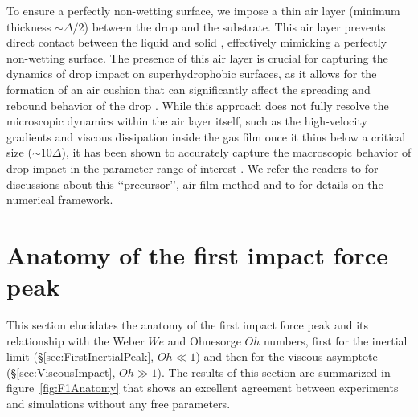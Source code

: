 \documentclass{jfm}
\begin{document}
To ensure a perfectly non-wetting surface, we impose a thin air layer (minimum thickness $\sim \Delta/2$) between the drop and the substrate. This air layer prevents direct contact between the liquid and solid \citep{kolinski-2014-epl, sprittles2024gas}, effectively mimicking a perfectly non-wetting surface. The presence of this air layer is crucial for capturing the dynamics of drop impact on superhydrophobic surfaces, as it allows for the formation of an air cushion that can significantly affect the spreading and rebound behavior of the drop \citep{ramirez2020lifting, sanjay_chantelot_lohse_2023}.
While this approach does not fully resolve the microscopic dynamics within the air layer itself, such as the high-velocity gradients and viscous dissipation inside the gas film once it thins below a critical size ($\sim 10\Delta$), it has been shown to accurately capture the macroscopic behavior of drop impact in the parameter range of interest \citep{ramirez2020lifting, sanjay2023drop, alventosa2023inertio, garcia2024skating}. We refer the readers to \citet{VatsalThesis} for discussions about this \lq\lq precursor\rq\rq, air film method and to \citet{popinet-basilisk, vatsal_sanjay_2023_7598181, zhang2022impact} for details on the numerical framework.

\section{Anatomy of the first impact force peak}\label{sec:FirstPeak}

This section elucidates the anatomy of the first impact force peak and its relationship with the Weber $We$ and Ohnesorge $Oh$ numbers, first for the inertial limit (\S\ref{sec:FirstInertialPeak}, $Oh \ll 1$) and then for the viscous asymptote (\S\ref{sec:ViscousImpact}, $Oh \gg 1$). The results of this section are summarized in figure~\ref{fig:F1Anatomy} that shows an excellent agreement between experiments and simulations without any free parameters. 
\end{document}
